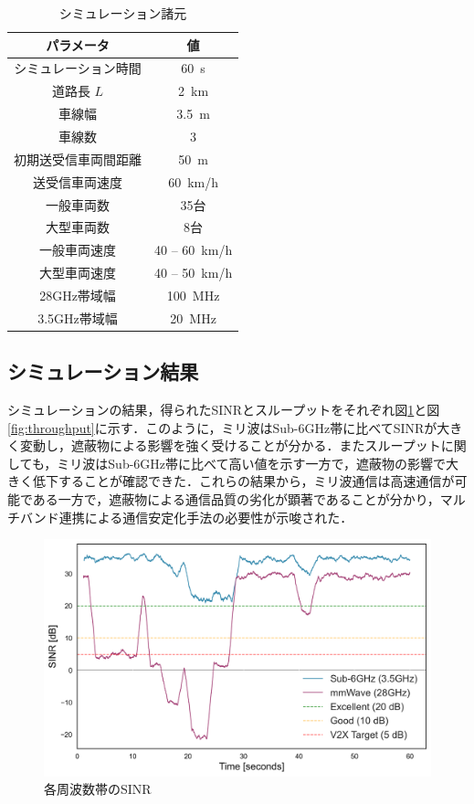 \documentclass[10pt, twocolumn, a4j, platex]{jsarticle}	%
\newcommand{\wfig}[1]{図\ref{fig:#1}}%
\begin{document}
\begin{table}[tb]
	\centering
	\caption{シミュレーション諸元}
	\begin{tabular}{cc}
		\hline
		パラメータ      & 値                   \\
		\hline
		シミュレーション時間 & \SI{60}{s}          \\
		道路長 $L$    & \SI{2}{km}          \\
		車線幅        & \SI{3.5}{m}         \\
		車線数        & 3                   \\
		初期送受信車両間距離 & \SI{50}{m}          \\
		送受信車両速度    & \SI{60}{km/h}       \\
		一般車両数      & 35台                 \\
		大型車両数      & 8台                  \\
		一般車両速度     & 40 -- \SI{60}{km/h} \\
		大型車両速度     & 40 -- \SI{50}{km/h} \\
		28GHz帯域幅   & \SI{100}{MHz}       \\
		3.5GHz帯域幅  & \SI{20}{MHz}        \\
		\hline
	\end{tabular}
	\label{tab:params}
\end{table}

\subsection{シミュレーション結果}

シミュレーションの結果，得られたSINRとスループットをそれぞれ\wfig{sinr}と\wfig{throughput}に示す．このように，ミリ波はSub-6GHz帯に比べてSINRが大きく変動し，遮蔽物による影響を強く受けることが分かる．またスループットに関しても，ミリ波はSub-6GHz帯に比べて高い値を示す一方で，遮蔽物の影響で大きく低下することが確認できた．これらの結果から，ミリ波通信は高速通信が可能である一方で，遮蔽物による通信品質の劣化が顕著であることが分かり，マルチバンド連携による通信安定化手法の必要性が示唆された．

\begin{figure}[tb]
	\centering
	\includegraphics[width=0.95\linewidth]{./images/sinr_comprehensive_analysis.png}
	\caption{各周波数帯のSINR} \label{fig:sinr}
\end{figure}
\end{document}
